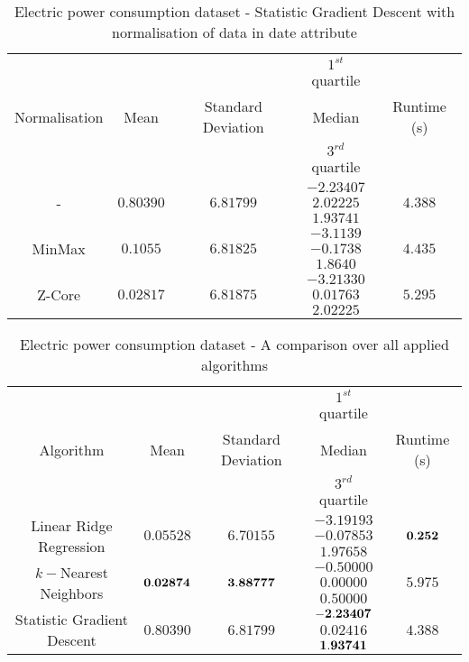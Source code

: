\begin{table}[p]
\begin{center} 
\begin{tabular}{|c|c|c|c|c|}
			\hline \multirow{3}{*}{Normalisation} &&& $1^{st}$ quartile
			&\\&Mean&Standard Deviation&Median& Runtime (s)\\&&& $3^{rd}$ quartile &\\
			\hline \multirow{3}{*}{-}&&&$-2.23407$&\\
			& $0.80390$ & $6.81799$  & $2.02225$ & $4.388$\\
			&&&$1.93741$& \\
			\hline \multirow{3}{*}{MinMax}&&&$-3.1139$ &\\
			& $0.1055$ & $6.81825$  & $-0.1738$ & $4.435$\\
			&&&	$1.8640$& \\
			\hline \multirow{3}{*}{Z-Core}&&&	$-3.21330$ &\\
			& $0.02817$ & $6.81875$  & $0.01763$ & $5.295$\\
			&&&	$2.02225$& \\
			\hline

		\end{tabular}
	\end{center}
\caption{Electric power consumption dataset - Statistic Gradient Descent with
normalisation of data in date attribute\label{ypmsd:table:ds3sgdnormal}}

\end{table}




\begin{table}[p]
\begin{center} 
\begin{tabular}{|c|c|c|c|c|}
			\hline \multirow{3}{*}{Algorithm} &&& $1^{st}$ quartile
			&\\&Mean&Standard Deviation&Median& Runtime (s)\\&&& $3^{rd}$ quartile &\\
			\hline \multirow{3}{*}{Linear Ridge
Regression}&&&$-3.19193$&\\
			& $0.05528$ & $6.70155$  & $-0.07853$ & $\bf {0.252}$\\
			 ($\alpha = 0.1$)&&&$1.97658$& \\
			\hline \multirow{3}{*}{$k-$Nearest Neighbors}&&&$-0.50000$&\\
			& $\bf {0.02874}$ & $\bf {3.88777}$  & $0.00000$ & $5.975$\\
			 ($k = 2$)&&&$0.50000$& \\
			\hline \multirow{3}{*}{Statistic Gradient Descent }&&&$\bf {-2.23407}$&\\
			& $0.80390$ & $6.81799$  & $0.02416$ & $4.388$\\
			({\it huber}, $\epsilon = 0.1$ )&&&$\bf {1.93741}$& \\
			\hline

		\end{tabular}
	\end{center}
\caption{Electric power consumption dataset - A comparison over all applied
algorithms\label{ypmsd:table:ds3comparison}}

\end{table}
